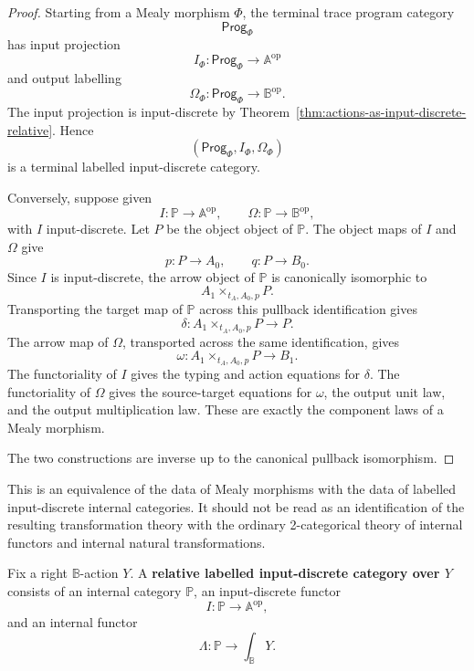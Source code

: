 \begin{proof}
Starting from a Mealy morphism \(\Phi\), the terminal trace program category
\[
\mathsf{Prog}_\Phi
\]
has input projection
\[
I_\Phi:\mathsf{Prog}_\Phi\to\mathbb A^{\mathrm{op}}
\]
and output labelling
\[
\Omega_\Phi:\mathsf{Prog}_\Phi\to\mathbb B^{\mathrm{op}}.
\]
The input projection is input-discrete by
Theorem~\ref{thm:actions-as-input-discrete-relative}. Hence
\[
(\mathsf{Prog}_\Phi,I_\Phi,\Omega_\Phi)
\]
is a terminal labelled input-discrete category.

Conversely, suppose given
\[
I:\mathbb P\to\mathbb A^{\mathrm{op}},
\qquad
\Omega:\mathbb P\to\mathbb B^{\mathrm{op}},
\]
with \(I\) input-discrete. Let \(P\) be the object object of \(\mathbb P\).
The object maps of \(I\) and \(\Omega\) give
\[
p:P\to A_0,
\qquad
q:P\to B_0.
\]
Since \(I\) is input-discrete, the arrow object of \(\mathbb P\) is canonically
isomorphic to
\[
A_1\times_{t_A,A_0,p}P.
\]
Transporting the target map of \(\mathbb P\) across this pullback
identification gives
\[
\delta:A_1\times_{t_A,A_0,p}P\to P.
\]
The arrow map of \(\Omega\), transported across the same identification, gives
\[
\omega:A_1\times_{t_A,A_0,p}P\to B_1.
\]
The functoriality of \(I\) gives the typing and action equations for
\(\delta\). The functoriality of \(\Omega\) gives the source-target equations
for \(\omega\), the output unit law, and the output multiplication law. These
are exactly the component laws of a Mealy morphism.

The two constructions are inverse up to the canonical pullback isomorphism.
\end{proof}

\begin{remark}
\label{rem:labelled-input-discrete-not-ordinary-2-theory}
This is an equivalence of the data of Mealy morphisms with the data of
labelled input-discrete internal categories. It should not be read as an
identification of the resulting transformation theory with the ordinary
2-categorical theory of internal functors and internal natural
transformations.
\end{remark}

\begin{definition}
\label{def:relative-labelled-input-discrete-category}
Fix a right \(\mathbb B\)-action \(Y\). A \textbf{relative labelled
input-discrete category over \(Y\)} consists of an internal category
\(\mathbb P\), an input-discrete functor
\[
I:\mathbb P\to\mathbb A^{\mathrm{op}},
\]
and an internal functor
\[
\Lambda:\mathbb P\to\int_{\mathbb B}Y.
\]
\end{definition}

